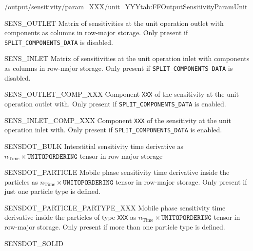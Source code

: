 \begin{groupscope}{/output/sensitivity/param\_XXX/unit\_YYY}{tab:FFOutputSensitivityParamUnit}
\begin{dataset}[type=double,unit={\si{\mol\per\cubic\metre\of{IV}\per\ParamUnit}}]{SENS\_OUTLET}
    Matrix of sensitivities at the unit operation outlet with components as columns in row-major storage.
    Only present if \texttt{SPLIT\_COMPONENTS\_DATA} is disabled.
  \end{dataset}
  \begin{dataset}[type=double,unit={\si{\mol\per\cubic\metre\of{IV}\per\ParamUnit}}]{SENS\_INLET}
    Matrix of sensitivities at the unit operation inlet with components as columns in row-major storage.
    Only present if \texttt{SPLIT\_COMPONENTS\_DATA} is disabled.
  \end{dataset}
  \begin{dataset}[type=double,unit={\si{\mol\per\cubic\metre\of{IV}\per\ParamUnit}}]{SENS\_OUTLET\_COMP\_XXX}
    Component \texttt{XXX} of the sensitivity at the unit operation outlet with.
    Only present if \texttt{SPLIT\_COMPONENTS\_DATA} is enabled.
  \end{dataset}
  \begin{dataset}[type=double,unit={\si{\mol\per\cubic\metre\of{IV}\per\ParamUnit}}]{SENS\_INLET\_COMP\_XXX}
    Component \texttt{XXX} of the sensitivity at the unit operation inlet with.
    Only present if \texttt{SPLIT\_COMPONENTS\_DATA} is enabled.
  \end{dataset}
  \begin{dataset}[type=double,unit={\si{\mol\per\cubic\metre\of{IV}\per\second\per\ParamUnit}}]{SENSDOT\_BULK}
    Interstitial sensitivity time derivative as $n_{\text{Time}} \times \texttt{UNITOPORDERING}$ tensor in row-major storage
  \end{dataset}
  \begin{dataset}[type=double,unit={\si{\mol\per\cubic\metre\of{MP}\per\second\per\ParamUnit}}]{SENSDOT\_PARTICLE}
    Mobile phase sensitivity time derivative inside the particles as $n_{\text{Time}} \times \texttt{UNITOPORDERING}$ tensor in row-major storage.
    Only present if just one particle type is defined.
  \end{dataset}
  \begin{dataset}[type=double,unit={\si{\mol\per\cubic\metre\of{MP}\per\second\per\ParamUnit}}]{SENSDOT\_PARTICLE\_PARTYPE\_XXX}
    Mobile phase sensitivity time derivative inside the particles of type \texttt{XXX} as $n_{\text{Time}} \times \texttt{UNITOPORDERING}$ tensor in row-major storage.
    Only present if more than one particle type is defined.
  \end{dataset}
  \begin{dataset}[type=double,unit={\si{\mol\per\cubic\metre\of{MP}\per\second\per\ParamUnit}}]{SENSDOT\_SOLID}

\end{dataset}
\end{groupscope}
